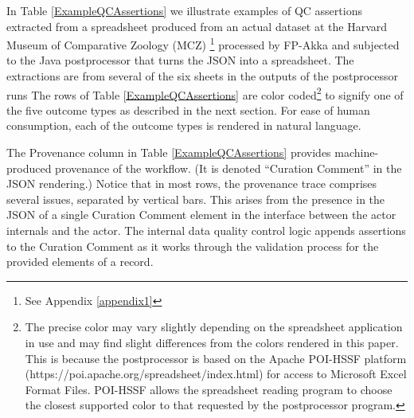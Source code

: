 \documentclass{article}
\begin{document}
In Table  \ref{ExampleQCAssertions}
we illustrate examples of QC assertions extracted from a spreadsheet produced from an actual dataset at the Harvard Museum of Comparative Zoology (MCZ)
\footnote{See Appendix \ref{appendix1}} 
processed by FP-Akka and subjected to the Java postprocessor that turns the JSON into a spreadsheet. 
The extractions are from several of the six sheets in the outputs of  the postprocessor runs
The rows of Table \ref{ExampleQCAssertions} are color coded\footnote{The precise color may vary slightly depending on the spreadsheet application in use and may find slight differences from the colors rendered in this paper. This is because the postprocessor is based on the Apache POI-HSSF platform (https://poi.apache.org/spreadsheet/index.html) for access to Microsoft Excel Format Files. POI-HSSF allows the spreadsheet reading program to choose the closest supported color to that requested by the postprocessor program.} to signify one of the five outcome types as described in the next section. For ease of human consumption, each of the outcome types is rendered in natural language. 




The Provenance column in Table \ref{ExampleQCAssertions} provides machine-produced provenance of the workflow. (It is denoted ``Curation Comment'' in the JSON rendering.) 
 Notice that in most rows, the provenance trace comprises several issues, separated by vertical bars.  This arises from the presence in the JSON of a single Curation Comment element in the interface between the actor internals and the actor.  The internal data quality control logic appends assertions to the Curation Comment as it works through the validation process for the provided elements of a record. 
\end{document}
